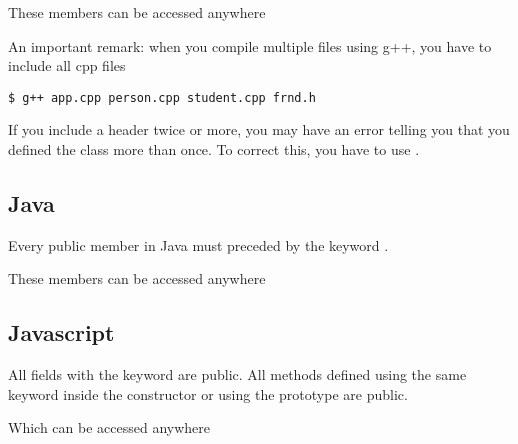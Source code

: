 \documentclass{KodeBook}
\begin{document}


These members can be accessed anywhere



An important remark: when you compile multiple files using g++, you have to include all cpp files
\begin{lstlisting}[style=shellStyle]
$ g++ app.cpp person.cpp student.cpp frnd.h
\end{lstlisting}

If you include a header twice or more, you may have an error telling you that you defined the class more than once. 
To correct this, you have to use .



\subsection{Java}

Every public member in Java must preceded by the keyword . 



These members can be accessed anywhere


\subsection{Javascript} 

All fields with the keyword  are public. 
All methods defined using the same keyword inside the constructor or using the prototype are public.



Which can be accessed anywhere


\end{document}
